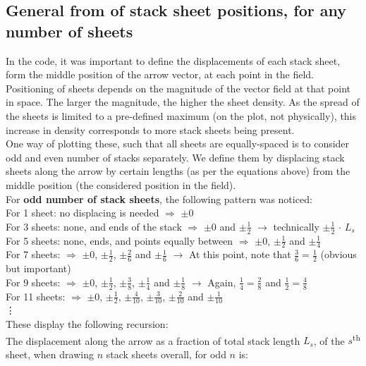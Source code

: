 \documentclass[11]{report}
\begin{document}
\subsection{General from of stack sheet positions, for any number of sheets}

In the code, it was important to define the displacements of each stack sheet, form the middle position of the arrow vector, at each point in the field. Positioning of sheets depends on the magnitude of the vector field at that point in space. The larger the magnitude, the higher the sheet density. As the spread of the sheets is limited to a pre-defined maximum (on the plot, not physically), this increase in density corresponds to more stack sheets being present.\\
One way of plotting these, such that all sheets are equally-spaced is to consider odd and even number of stacks separately. We define them by displacing stack sheets along the arrow by certain lengths (as per the equations above) from the middle position (the considered position in the field).\\

\noindent For {\bf odd number of stack sheets}, the following pattern was noticed:\\
\small
For 1 sheet: no displacing is needed $\Rightarrow$ $\pm0$\\
For 3 sheets: none, and ends of the stack $\Rightarrow$ $\pm0$ and  $\pm\frac{1}{2}$ $\longrightarrow$ technically $\pm\frac{1}{2}$ $\cdot$ $L_s$\\
For 5 sheets: none, ends, and points equally between $\Rightarrow$ $\pm0$, $\pm\frac{1}{2}$ and $\pm\frac{1}{4}$\\
For 7 sheets: $\Rightarrow$ $\pm0$, $\pm\frac{1}{2}$, $\pm\frac{2}{6}$ and $\pm\frac{1}{6}$ $\longrightarrow$ At this point, note that $\frac{3}{6} = \frac{1}{2}$ (obvious but important)\\
For 9 sheets: $\Rightarrow$ $\pm0$, $\pm\frac{1}{2}$, $\pm\frac{3}{8}$, $\pm\frac{1}{4}$ and $\pm\frac{1}{8}$ $\longrightarrow$ Again, $\frac{1}{4} = \frac{2}{8}$ and $\frac{1}{2} = \frac{4}{8}$\\
For 11 sheets: $\Rightarrow$ $\pm0$, $\pm\frac{1}{2}$, $\pm\frac{4}{10}$, $\pm\frac{3}{10}$, $\pm\frac{2}{10}$  and $\pm\frac{1}{10}$\\
\vdots\\
\normalsize
\noindent These display the following recursion:\\
The displacement along the arrow as a fraction of total stack length $L_s$, of the $s$\textsuperscript{th} sheet, when drawing $n$ stack sheets overall, for odd $n$ is:
\end{document}
